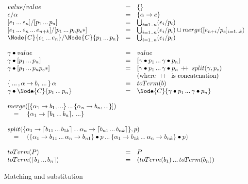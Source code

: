 \begin{figure*}[t]
\[\begin{array}{lclll}
\Match{\Value}{\Value} &=& \{\} \\
\Match{e}{\PVarA} &=& \{\PVarA \to e\} \\
\Match{[e_1 \dd e_n]}{[p_1 \dd p_n]} &=&
  \bigcup_{i=1..n} (\Match{e_i}{p_i}) \\
\Match{[e_1 \dd e_n \dd e_{n+k}]}{[p_1 \dd p_n \Ell{p_e}]} &=&
  \bigcup_{i=1..n} (\Match{e_i}{p_i}) \cup
  merge([\Match{e_{n+i}}{p_e}]_{i=1..k}) \\
\Match{\Node{C}{e_1 \dd e_n}}{\Node{C}{p_1 \dd p_n}} &=&
  \bigcup_{i=1..n} (\Match{e_i}{p_i}) \\ \\

\Subs{\gamma}{\Value}        &=& \Value \\
\Subs{\gamma}{[p_1 \dd p_n]}    &=& [\Subs{\gamma}{p_1} \dd \Subs{\gamma}{p_n}) \\
\Subs{\gamma}{[p_1 \dd p_n \Ell{p_e}]} &=&
  [\Subs{\gamma}{p_1} \dd \Subs{\gamma}{p_n\,\DoublePlus\,split(\gamma, p_e)} \\
    &&\text{(where } \DoublePlus \text{ is concatenation)} \\
\{\dd,\PVarA \to b,\dd\}\,\PVarA &=& toTerm(b) \\
\Subs{\gamma}{\Node{C}{p_1 \dd p_n}} &=&
  \Node{C}{\Subs{\gamma}{p_1} \dd \Subs{\gamma}{p_n}} \\ \\

\multicolumn{3}{l}{merge([\{\PVarA_1 \to b_1,...\} \dd \{\PVarA_n \to b_n,...\}])} \\
\multicolumn{3}{l}{\quad=\quad \{\PVarA_1 \to \BList{b_1 \dd b_n},\,...\}} \\ \\

\multicolumn{3}{l}{split(\{\PVarA_1 \to \BList{b_{11} \dd b_{1k}} \dd 
  \PVarA_n \to \BList{b_{n1} \dd b_{nk}}\}, p)} \\
\multicolumn{3}{l}{\quad=\quad
  (\Subs{\{\PVarA_1 \to b_{11} \dd  \PVarA_n \to b_{n1}\}}{p} \dd 
   \Subs{\{\PVarA_1 \to b_{1k} \dd  \PVarA_n \to b_{nk}\}}{p})} \\ \\

toTerm(P) &=& P \\
toTerm(\BList{b_1 \dd b_n}) &=&
  (toTerm(b_1) \dd toTerm(b_n))

\end{array}\]
\caption{Matching and substitution}
\label{fig:formal-subs}
\end{figure*}


